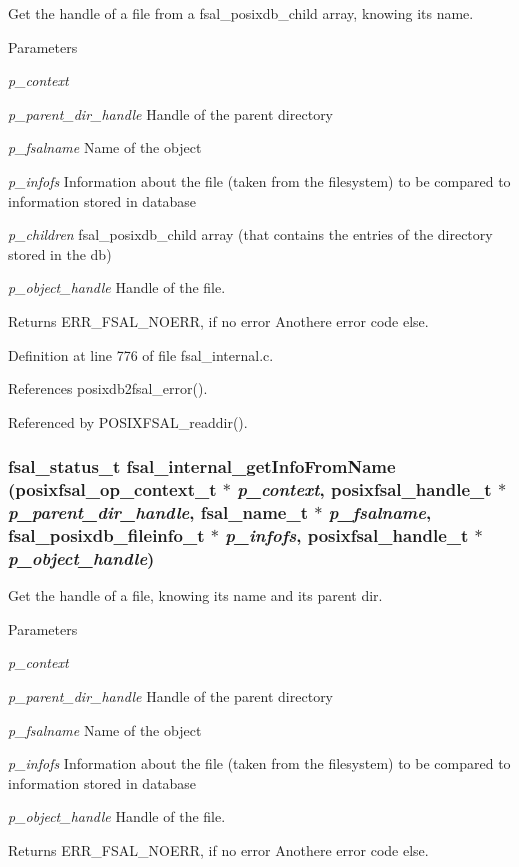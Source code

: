 Get the handle of a file from a fsal\_\-posixdb\_\-child array, knowing its name. 
\begin{DoxyParams}{Parameters}
\item[{\em p\_\-context}]\item[{\em p\_\-parent\_\-dir\_\-handle}]Handle of the parent directory \item[{\em p\_\-fsalname}]Name of the object \item[{\em p\_\-infofs}]Information about the file (taken from the filesystem) to be compared to information stored in database \item[{\em p\_\-children}]fsal\_\-posixdb\_\-child array (that contains the entries of the directory stored in the db) \item[{\em p\_\-object\_\-handle}]Handle of the file.\end{DoxyParams}
\begin{DoxyReturn}{Returns}
ERR\_\-FSAL\_\-NOERR, if no error Anothere error code else. 
\end{DoxyReturn}


Definition at line 776 of file fsal\_\-internal.c.

References posixdb2fsal\_\-error().

Referenced by POSIXFSAL\_\-readdir().
\subsubsection[{fsal\_\-internal\_\-getInfoFromName}]{\setlength{\rightskip}{0pt plus 5cm}fsal\_\-status\_\-t fsal\_\-internal\_\-getInfoFromName (posixfsal\_\-op\_\-context\_\-t $\ast$ {\em p\_\-context}, \/  posixfsal\_\-handle\_\-t $\ast$ {\em p\_\-parent\_\-dir\_\-handle}, \/  fsal\_\-name\_\-t $\ast$ {\em p\_\-fsalname}, \/  fsal\_\-posixdb\_\-fileinfo\_\-t $\ast$ {\em p\_\-infofs}, \/  posixfsal\_\-handle\_\-t $\ast$ {\em p\_\-object\_\-handle})}\label{fsal__internal_8c_a90b554777f1f9229ca60d77d55fc95e6}


Get the handle of a file, knowing its name and its parent dir. 
\begin{DoxyParams}{Parameters}
\item[{\em p\_\-context}]\item[{\em p\_\-parent\_\-dir\_\-handle}]Handle of the parent directory \item[{\em p\_\-fsalname}]Name of the object \item[{\em p\_\-infofs}]Information about the file (taken from the filesystem) to be compared to information stored in database \item[{\em p\_\-object\_\-handle}]Handle of the file.\end{DoxyParams}
\begin{DoxyReturn}{Returns}
ERR\_\-FSAL\_\-NOERR, if no error Anothere error code else. 
\end{DoxyReturn}


